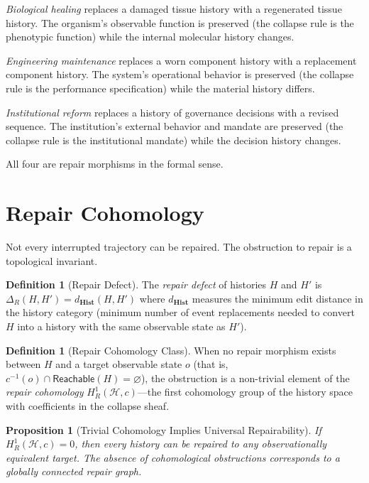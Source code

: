 \documentclass[12pt, a4paper, openany]{book}
\theoremstyle{plain}
\newtheorem{proposition}[theorem]{Proposition}
\theoremstyle{definition}
\newtheorem{definition}[theorem]{Definition}
\theoremstyle{remark}
\newcommand{\Hist}{\mathbf{Hist}}
\newcommand{\calH}{\mathcal{H}}
\begin{document}
\emph{Biological healing} replaces a damaged tissue history with a regenerated
tissue history. The organism's observable function is preserved (the collapse rule
is the phenotypic function) while the internal molecular history changes.

\emph{Engineering maintenance} replaces a worn component history with a replacement
component history. The system's operational behavior is preserved (the collapse
rule is the performance specification) while the material history differs.

\emph{Institutional reform} replaces a history of governance decisions with a
revised sequence. The institution's external behavior and mandate are preserved
(the collapse rule is the institutional mandate) while the decision history changes.

All four are repair morphisms in the formal sense.

\section{Repair Cohomology}

Not every interrupted trajectory can be repaired. The obstruction to repair is
a topological invariant.

\begin{definition}[Repair Defect]
The \emph{repair defect} of histories $H$ and $H'$ is
$\Delta_R(H, H') = d_{\Hist}(H, H')$ where $d_{\Hist}$ measures the minimum
edit distance in the history category (minimum number of event replacements
needed to convert $H$ into a history with the same observable state as $H'$).
\end{definition}

\begin{definition}[Repair Cohomology Class]
When no repair morphism exists between $H$ and a target observable state $o$
(that is, $c^{-1}(o) \cap \mathsf{Reachable}(H) = \varnothing$), the
obstruction is a non-trivial element of the \emph{repair cohomology}
$H^1_R(\calH, c)$---the first cohomology group of the history space with
coefficients in the collapse sheaf.
\end{definition}

\begin{proposition}[Trivial Cohomology Implies Universal Repairability]
If $H^1_R(\calH, c) = 0$, then every history can be repaired to any
observationally equivalent target. The absence of cohomological obstructions
corresponds to a globally connected repair graph.
\end{proposition}
\end{document}
